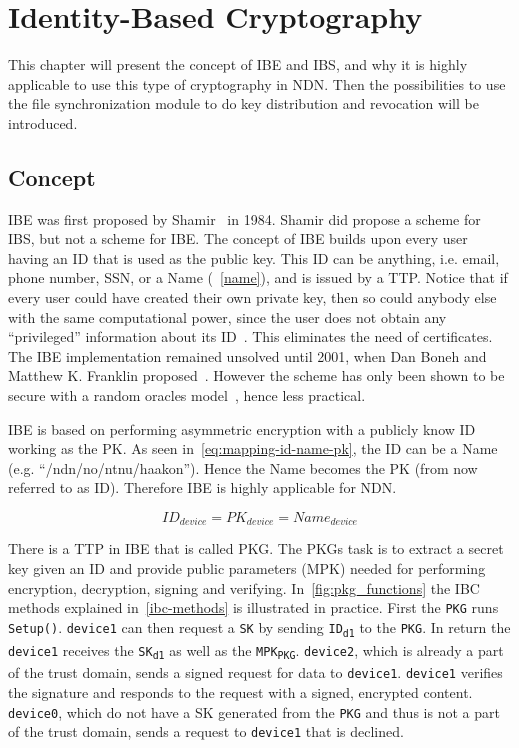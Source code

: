 \chapter{Identity-Based Cryptography}
This chapter will present the concept of \gls{IBE} and \gls{IBS}, and why it is highly applicable to use this type of cryptography in \gls{NDN}. 
Then the possibilities to use the file synchronization module to do key distribution and revocation will be introduced.

\section{Concept}\label{ibc}
\gls{IBE} was first proposed by Shamir~\cite{DBLP:conf/crypto/Shamir84} in 1984. 
Shamir did propose a scheme for \gls{IBS}, but not a scheme for \gls{IBE}. 
The concept of \gls{IBE} builds upon every user having an \gls{ID} that is used as the public key. 
This \gls{ID} can be anything, i.e. email, phone number, \gls{SSN}, or a Name (~\autoref{name}), and is issued by a \gls{TTP}.
Notice that if every user could have created their own private key, then so could anybody else with the same computational power, since the user does not obtain any ``privileged'' information about its \gls{ID}~\cite{Bidgoli06}.
This eliminates the need of certificates.
The \gls{IBE} implementation remained unsolved until 2001, when Dan Boneh and Matthew K. Franklin proposed~\cite{DBLP:conf/crypto/BonehF01}.
However the scheme has only been shown to be secure with a random oracles model~\cite{DBLP:journals/iacr/Waters04}, hence less practical.

\gls{IBE} is based on performing asymmetric encryption with a publicly know \gls{ID} working as the \gls{PK}.
As seen in~\autoref{eq:mapping-id-name-pk}, the \gls{ID} can be a Name (e.g. ``/ndn/no/ntnu/haakon'').
Hence the Name becomes the \gls{PK} (from now referred to as \gls{ID}).
Therefore \gls{IBE} is highly applicable for \gls{NDN}.

\begin{equation}\label{eq:mapping-id-name-pk}
ID_{device} = PK_{device} = Name_{device}
\end{equation}

There is a \gls{TTP} in \gls{IBE} that is called \gls{PKG}.
The \gls{PKG}s task is to extract a secret key given an \gls{ID} and provide public parameters (\gls{MPK}) needed for performing encryption, decryption, signing and verifying. In~\autoref{fig:pkg_functions} the \gls{IBC} methods explained in~\autoref{ibc-methods} is illustrated in practice. 
First the \texttt{PKG} runs \texttt{Setup()}. 
\texttt{device1} can then request a \texttt{SK} by sending \texttt{ID\textsubscript{d1}} to the \texttt{PKG}. 
In return the \texttt{device1} receives the \texttt{SK\textsubscript{d1}} as well as the \texttt{MPK\textsubscript{PKG}}.
\texttt{device2}, which is already a part of the trust domain, sends a signed request for data to \texttt{device1}. 
\texttt{device1} verifies the signature and responds to the request with a signed, encrypted content.
\texttt{device0}, which do not have a \gls{SK} generated from the \texttt{PKG} and thus is not a part of the trust domain, sends a request to \texttt{device1} that is declined.

